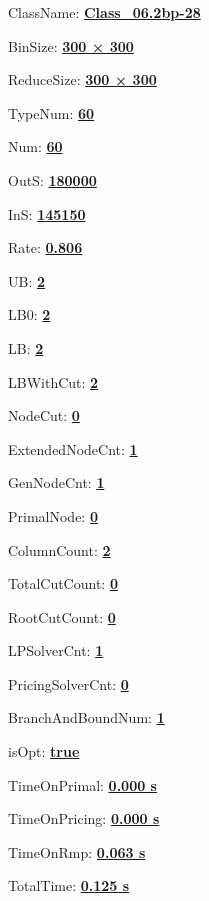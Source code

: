 \documentclass[11pt]{article}
\begin{document}
\pagestyle{empty}


ClassName: \underline{\textbf{Class_06.2bp-28}}
\par
BinSize: \underline{\textbf{300 × 300}}
\par
ReduceSize: \underline{\textbf{300 × 300}}
\par
TypeNum: \underline{\textbf{60}}
\par
Num: \underline{\textbf{60}}
\par
OutS: \underline{\textbf{180000}}
\par
InS: \underline{\textbf{145150}}
\par
Rate: \underline{\textbf{0.806}}
\par
UB: \underline{\textbf{2}}
\par
LB0: \underline{\textbf{2}}
\par
LB: \underline{\textbf{2}}
\par
LBWithCut: \underline{\textbf{2}}
\par
NodeCut: \underline{\textbf{0}}
\par
ExtendedNodeCnt: \underline{\textbf{1}}
\par
GenNodeCnt: \underline{\textbf{1}}
\par
PrimalNode: \underline{\textbf{0}}
\par
ColumnCount: \underline{\textbf{2}}
\par
TotalCutCount: \underline{\textbf{0}}
\par
RootCutCount: \underline{\textbf{0}}
\par
LPSolverCnt: \underline{\textbf{1}}
\par
PricingSolverCnt: \underline{\textbf{0}}
\par
BranchAndBoundNum: \underline{\textbf{1}}
\par
isOpt: \underline{\textbf{true}}
\par
TimeOnPrimal: \underline{\textbf{0.000 s}}
\par
TimeOnPricing: \underline{\textbf{0.000 s}}
\par
TimeOnRmp: \underline{\textbf{0.063 s}}
\par
TotalTime: \underline{\textbf{0.125 s}}
\par
\newpage
\end{document}
